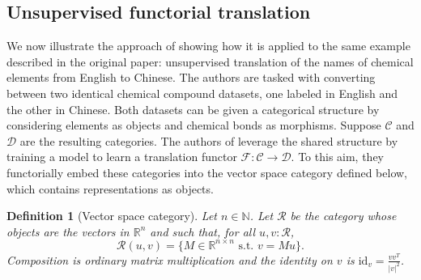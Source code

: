 \documentclass[11pt,a4paper,openright,twoside]{report}
\newcounter{mycounter}
\theoremstyle{plain}
\newtheorem{definition}[mycounter]{Definition}
\theoremstyle{definition}
\begin{document}
\subsection{Unsupervised functorial translation}

We now illustrate the approach of \cite{sheshmani2021categorical} showing how it is applied to the same example described in the original paper: unsupervised translation of the names of chemical elements from English to Chinese. The authors are tasked with converting between two identical chemical compound datasets, one labeled in English and the other in Chinese. Both datasets can be given a categorical structure by considering elements as objects and chemical bonds as morphisms. Suppose $\mathcal{C}$ and $\mathcal{D}$ are the resulting categories. The authors of \cite{sheshmani2021categorical} leverage the shared structure by training a model to learn a translation functor $\mathcal{F}: \mathcal{C} \to \mathcal{D}$. To this aim, they functorially embed these categories into the vector space category defined below, which contains representations as objects.

\begin{definition}[Vector space category]
  \label{def: vecspacecat}
  Let $n \in \mathbb{N}$. Let $\mathcal{R}$ be the category whose objects are the vectors in $\mathbb{R}^n$ and such that, for all $u,v :\mathcal{R}$, 
  \[\mathcal{R}(u, v) = \{M \in \mathbb{R}^{n \times n} \text{ s.t. } v = Mu\}.\]
  Composition is ordinary matrix multiplication and the identity on $v$ is $\mathrm{id}_v = \frac{vv^T}{|v|^2}$.
\end{definition}
\end{document}
